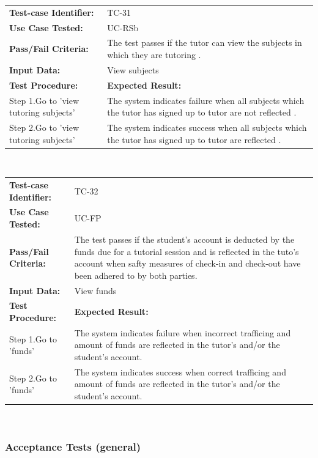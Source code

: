 \documentclass[12pt]{article}
\begin{document}
{\begin{tabular}{| p{8cm} | p{8cm} |} \hline
	\textbf{Test-case Identifier:}& TC-31\\
	\textbf{Use Case Tested:}& UC-RSb\\
	\textbf{Pass/Fail Criteria:}& The test passes if the tutor can view the  subjects in which they are tutoring .\\
	\textbf{Input Data:}& View subjects\\\hline
	\textbf{Test Procedure:}& \textbf{Expected Result:} \\\hline
	Step 1.Go to 'view tutoring subjects' & The system indicates failure when all subjects which the tutor has signed up to tutor  are not reflected . \\
	Step 2.Go to 'view tutoring subjects' & The system indicates success when all subjects which the tutor has signed up to tutor are reflected . \\
		\hline
\end{tabular}
\\


\begin{tabular}{| p{8cm} | p{8cm} |} \hline
	\textbf{Test-case Identifier:}& TC-32\\
	\textbf{Use Case Tested:}& UC-FP\\
	\textbf{Pass/Fail Criteria:}& The test passes if the student's account is deducted by the funds due for a tutorial session and is reflected in the tuto's account when safty measures of check-in and check-out have been adhered to by both parties.\\
	\textbf{Input Data:}& View funds\\\hline
	\textbf{Test Procedure:}& \textbf{Expected Result:} \\\hline
	Step 1.Go to 'funds' & The system indicates failure when incorrect trafficing and amount of funds are reflected in the tutor's and/or the student's account. \\
	Step 2.Go to 'funds' & The system indicates success when correct trafficing and amount of funds are reflected in the tutor's and/or the student's account. \\
		\hline
\end{tabular}
\\
}

\subsubsection{Acceptance Tests (general)}
\end{document}
